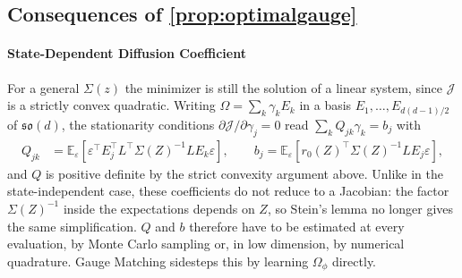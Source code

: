 \documentclass{article} %
\newcommand{\gauge}{\Omega}
\newcommand{\skewset}{\mathfrak{so}}
\newcommand{\E}{\mathbb{E}}
\begin{document}
\subsection{Consequences of \texorpdfstring{\cref{prop:optimalgauge}}{Proposition 3}}\label{sec:optimalgaugeconsequences}

\paragraph{State-Dependent Diffusion Coefficient}
For a general $\Sigma(z)$ the minimizer is still the solution of a linear system, since $\mathcal{J}$ is a strictly convex quadratic. Writing $\gauge = \sum_{k} \gamma_k E_k$ in a basis $E_1, \ldots, E_{d(d-1)/2}$ of $\skewset(d)$, the stationarity conditions $\partial \mathcal{J} / \partial \gamma_j = 0$ read $\sum_k Q_{jk} \gamma_k = b_j$ with
\begin{align*}
    Q_{jk} &= \E_\varepsilon\left[ \varepsilon^\top E_j^\top L^\top \Sigma(Z)^{-1} L E_k \varepsilon \right], \qquad
    b_j = \E_\varepsilon\left[ r_0(Z)^\top \Sigma(Z)^{-1} L E_j \varepsilon \right],
\end{align*}
and $Q$ is positive definite by the strict convexity argument above. Unlike in the state-independent case, these coefficients do not reduce to a Jacobian: the factor $\Sigma(Z)^{-1}$ inside the expectations depends on $Z$, so Stein's lemma no longer gives the same simplification. $Q$ and $b$ therefore have to be estimated at every evaluation, by Monte Carlo sampling or, in low dimension, by numerical quadrature. Gauge Matching sidesteps this by learning $\gauge_\phi$ directly.
\end{document}
